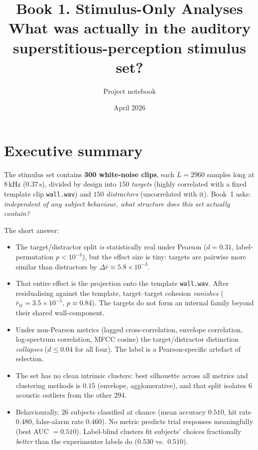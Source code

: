 \documentclass[11pt]{article}
\title{\textbf{Book 1.  Stimulus-Only Analyses}\\
       \large What was actually in the auditory superstitious-perception stimulus set?}
\author{Project notebook}
\date{April 2026}
\begin{document}
\maketitle
\tableofcontents
\bigskip

\section*{Executive summary}

The stimulus set contains \textbf{300 white-noise clips}, each $L = 2960$
samples long at $8\,\mathrm{kHz}$ ($0.37\,\mathrm{s}$), divided by design into
$150$ \emph{targets} (highly correlated with a fixed template clip
\texttt{wall.wav}) and $150$ \emph{distractors} (uncorrelated with it).  Book~1
asks: \emph{independent of any subject behaviour, what structure does this
set actually contain?}

The short answer:

\begin{itemize}
\item The target/distractor split \emph{is} statistically real under Pearson
      ($d = 0.31$, label-permutation $p < 10^{-3}$), but the effect size is
      tiny: targets are pairwise more similar than distractors by
      $\Delta\bar r \approx 5.8\times 10^{-3}$.
\item That entire effect is the projection onto the template \texttt{wall.wav}.
      After residualising against the template, target--target cohesion
      \emph{vanishes} ($\bar r_{tt} = 3.5\times 10^{-5}$, $p \approx 0.84$).
      The targets do not form an internal family beyond their shared
      wall-component.
\item Under non-Pearson metrics (lagged cross-correlation, envelope
      correlation, log-spectrum correlation, MFCC cosine) the
      target/distractor distinction \emph{collapses} ($d \le 0.04$ for all
      four).  The label is a Pearson-specific artefact of selection.
\item The set has no clean intrinsic clusters: best silhouette across all
      metrics and clustering methods is $0.15$ (envelope, agglomerative),
      and that split isolates $6$ acoustic outliers from the other $294$.
\item Behaviourally, $26$ subjects classified at chance (mean accuracy
      $0.510$, hit rate $0.480$, false-alarm rate $0.460$).  No metric
      predicts trial responses meaningfully (best AUC $= 0.510$).
      Label-blind clusters fit subjects' choices fractionally
      \emph{better} than the experimenter labels do
      ($0.530$ vs.\ $0.510$).
\end{itemize}
\end{document}
